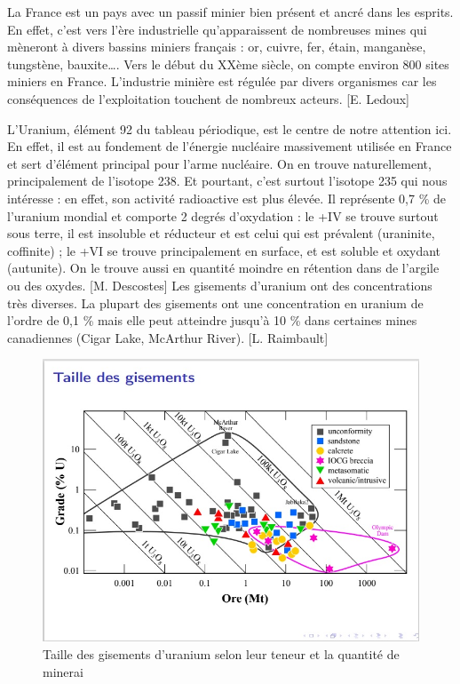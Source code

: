 \documentclass{article}
\begin{document}
La France est un pays avec un passif minier bien présent et ancré dans les esprits. En effet, c’est vers l’ère industrielle qu’apparaissent de nombreuses mines qui mèneront à divers bassins miniers français : or, cuivre, fer, étain, manganèse, tungstène, bauxite…. Vers le début du XXème siècle, on compte environ 800 sites miniers en France. L’industrie minière est régulée par divers organismes car les conséquences de l’exploitation touchent de nombreux acteurs. [E. Ledoux]

L’Uranium, élément 92 du tableau périodique, est le centre de notre attention ici. En effet, il est au fondement de l’énergie nucléaire massivement utilisée en France et sert d’élément principal pour l’arme nucléaire. On en trouve naturellement, principalement de l’isotope 238. Et pourtant, c’est surtout l’isotope 235 qui nous intéresse : en effet, son activité radioactive est plus élevée. Il représente 0,7 \% de l’uranium mondial et comporte 2 degrés d’oxydation : le +IV se trouve surtout sous terre, il est insoluble et réducteur et est celui qui est prévalent (uraninite, coffinite) ; le +VI se trouve principalement en surface, et est soluble et oxydant (autunite). On le trouve aussi en quantité moindre en rétention dans de l’argile ou des oxydes. [M. Descostes]
Les gisements d’uranium ont des concentrations très diverses. La plupart des gisements ont une concentration en uranium de l’ordre de 0,1 \% mais elle peut atteindre jusqu’à 10 \% dans certaines mines canadiennes (Cigar Lake, McArthur River). [L. Raimbault]

\begin{figure}[!h]
    \centering
    \includegraphics[width = \linewidth]{I_A_1.jpg}
    \caption{Taille des gisements d'uranium selon leur teneur et la quantité de minerai}
    \label{fig:gisements_uranium}
\end{figure}
\end{document}
